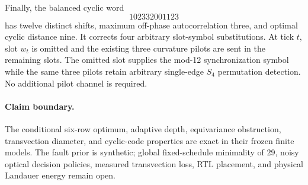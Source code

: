 Finally, the balanced cyclic word
\[
  102332001123
\]
has twelve distinct shifts, maximum off-phase autocorrelation three, and optimal
cyclic distance nine.  It corrects four arbitrary slot-symbol substitutions.
At tick $t$, slot $w_t$ is omitted and the existing three curvature pilots are
sent in the remaining slots.  The omitted slot supplies the mod-12
synchronization symbol while the same three pilots retain arbitrary single-edge
$S_4$ permutation detection.  No additional pilot channel is required.

\paragraph{Claim boundary.}
The conditional six-row optimum, adaptive depth, equivariance obstruction,
transvection diameter, and cyclic-code properties are exact in their frozen
finite models.  The fault prior is synthetic; global fixed-schedule minimality
of 29, noisy optical decision policies, measured transvection loss, RTL
placement, and physical Landauer energy remain open.
